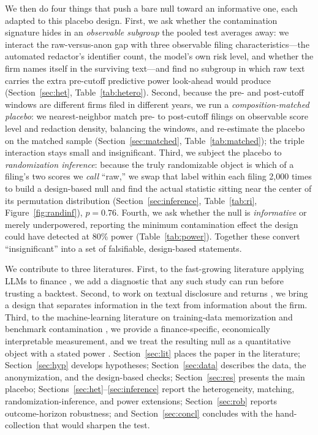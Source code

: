 \documentclass[12pt]{article}
\begin{document}
We then do four things that push a bare null toward an informative one, each adapted to this
placebo design. First, we ask whether the contamination signature hides in an
\emph{observable subgroup} the pooled test averages away: we interact the raw-versus-anon gap
with three observable filing characteristics---the automated redactor's identifier count, the
model's own risk level, and whether the firm names itself in the surviving text---and find no
subgroup in which raw text carries the extra pre-cutoff predictive power look-ahead would
produce (Section~\ref{sec:het}, Table~\ref{tab:hetero}). Second, because the pre- and
post-cutoff windows are different firms filed in different years, we run a
\emph{composition-matched placebo}: we nearest-neighbor match pre- to post-cutoff filings on
observable score level and redaction density, balancing the windows, and re-estimate the
placebo on the matched sample (Section~\ref{sec:matched}, Table~\ref{tab:matched}); the
triple interaction stays small and insignificant. Third, we subject the placebo to
\emph{randomization inference}: because the truly randomizable object is which of a filing's
two scores we \emph{call} ``raw,'' we swap that label within each filing 2{,}000 times to
build a design-based null and find the actual statistic sitting near the center of its
permutation distribution (Section~\ref{sec:inference}, Table~\ref{tab:ri},
Figure~\ref{fig:randinf}), $p=0.76$. Fourth, we ask whether the null is \emph{informative} or
merely underpowered, reporting the minimum contamination effect the design could have
detected at 80\% power (Table~\ref{tab:power}). Together these convert ``insignificant'' into
a set of falsifiable, design-based statements.

We contribute to three literatures. First, to the fast-growing literature applying LLMs to
finance \citep{lopezlira2023,kim2024,jha2024,kelly2019,hansen2023}, we add a diagnostic that
any such study can run before trusting a backtest. Second, to work on textual disclosure and
returns \citep{cohen2020,loughran2011,campbell2014,kravet2013,tetlock2007}, we bring a design
that separates information in the text from information about the firm. Third, to the
machine-learning literature on training-data memorization and benchmark contamination
\citep{carlini2021,sainz2023,magar2022,glasserman2023}, we provide a finance-specific,
economically interpretable measurement, and we treat the resulting null as a quantitative
object with a stated power \citep{abadie2020,young2019}. Section~\ref{sec:lit} places the
paper in the literature; Section~\ref{sec:hyp} develops hypotheses; Section~\ref{sec:data}
describes the data, the anonymization, and the design-based checks; Section~\ref{sec:res}
presents the main placebo; Sections~\ref{sec:het}--\ref{sec:inference} report the
heterogeneity, matching, randomization-inference, and power extensions;
Section~\ref{sec:rob} reports outcome-horizon robustness; and Section~\ref{sec:concl}
concludes with the hand-collection that would sharpen the test.
\end{document}
